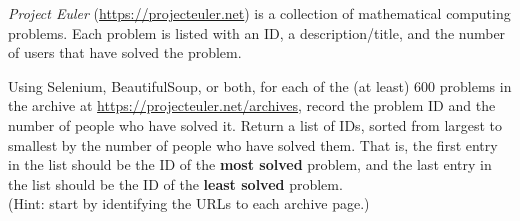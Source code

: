 \emph{Project Euler} (\url{https://projecteuler.net}) is a collection of mathematical computing problems.
Each problem is listed with an ID, a description/title, and the number of users that have solved the problem.

Using Selenium, BeautifulSoup, or both, for each of the (at least) 600 problems in the archive at \url{https://projecteuler.net/archives}, record the problem ID and the number of people who have solved it.
Return a list of IDs, sorted from largest to smallest by the number of people who have solved them.
That is, the first entry in the list should be the ID of the \textbf{most solved} problem, and the last entry in the list should be the ID of the \textbf{least solved} problem.
\\(Hint: start by identifying the URLs to each archive page.)
